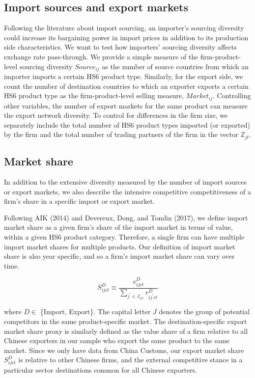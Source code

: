 \subsection{Import sources and export markets}\label{sec-4.2.4}
Following the literature about import sourcing, an importer's sourcing diversity could increase its bargaining power in import prices in addition to its production side characteristics. We want to test how importers' sourcing diversity affects exchange rate pass-through. We provide a simple measure of the firm-product-level sourcing diversity $Source_{ij}$ as the number of source countries from which an importer imports a certain HS6 product type. Similarly, for the export side, we count the number of destination countries to which an exporter exports a certain HS6 product type as the firm-product-level selling measure, $Market_{ij}$. Controlling other variables, the number of export markets for the same product can measure the export network diversity. To control for differences in the firm size, we separately include the total number of HS6 product types imported (or exported) by the firm and the total number of trading partners of the firm in the vector $\mathbb{Z}_{jt}$.

\subsection{Market share}\label{sec-4.2.5}

In addition to the extensive diversity measured by the number of import sources or export markets, we also describe the intensive competitive competitiveness of a firm's share in a specific import or export market. 

Following AIK (2014)\cite{aik2014} and Devereux, Dong, and Tomlin (2017)\cite{devereux2017}, we define import market share as a given firm’s share of the import market in terms of value, within a given HS6 product category. Therefore, a single firm can have multiple import market shares for multiple products. Our definition of import market share is also year specific, and so a firm’s import market share can vary over time. 

$$
S^{D}_{ijct} \equiv \frac{v^{D}_{ijct}}{\sum_{j^{\prime} \in J_{ict}} v^{D}_{ij^{\prime}ct}}
$$

where $D \in$ \{Import, Export\}. The capital letter $J$ denotes the group of potential competitors in the same product-specific market. The destination-specific export market share proxy is similarly defined as the value share of a firm relative to all Chinese exporters in our sample who export the same product to the same market. Since we only have data from China Customs, our export market share $S^{D}_{ijct}$ is relative to other Chinese firms, and the external competitive stance in a particular sector destinations common for all Chinese exporters.